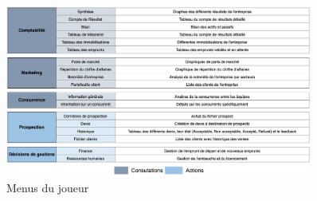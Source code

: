         \begin{figure}\centering
            \includegraphics[width=0.9\textwidth]{images/menus_joueur.png}
            \caption{Menus du joueur}
            \label{menus_joueur}
        \end{figure}